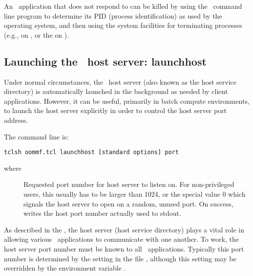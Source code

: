 An \OOMMF\ application that does not respond to  can be
killed by using the \OOMMF\ command line program
 to
determine its PID (process identification) as used by the operating
system, and then using the system facilities for terminating processes
(e.g.,  on \Unix, or the  on
\Windows).

\subsection{Launching the \OOMMF\ host server:
   launchhost\label{sec:launchhost}}%

Under normal circumstances, the \OOMMF\ host server (also known as the
host service directory) is automatically launched in the background as
needed by client applications.  However, it can be useful, primarily in
batch compute environments, to launch the host server explicitly in
order to control the host server port address.

The  command line is:
\begin{verbatim}
tclsh oommf.tcl launchhost [standard options] port
\end{verbatim}
where
\begin{description}
\item[]
Requested port number for host server to listen on.  For
non-privileged users, this usually has to be larger than 1024, or the
special value 0 which signals the host server to open on a random,
unused port.  On success,  writes the host port number
actually used to stdout.
\end{description}
As described in the , the host server (host service directory) plays a
vital role in allowing various \OOMMF\ applications to communicate
with one another.  To work, the host server port number must be known
to all \OOMMF\ applications.  Typically this port number is determined
by the  setting in the file
, although this
setting may be overridden by the environment variable
.

